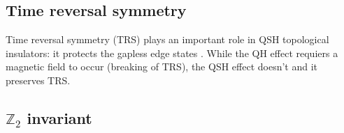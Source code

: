 \subsection{Time reversal symmetry}

Time reversal symmetry (TRS) plays an important role in QSH topological insulators: it protects the gapless edge states \cite{kane_topological_2013}. While the QH effect requiers a magnetic field to occur (breaking of TRS), the QSH effect doesn't and it preserves TRS\cite{cayssol_topological_2021}. 



\subsection{$\mathbb{Z}_2$ invariant}
